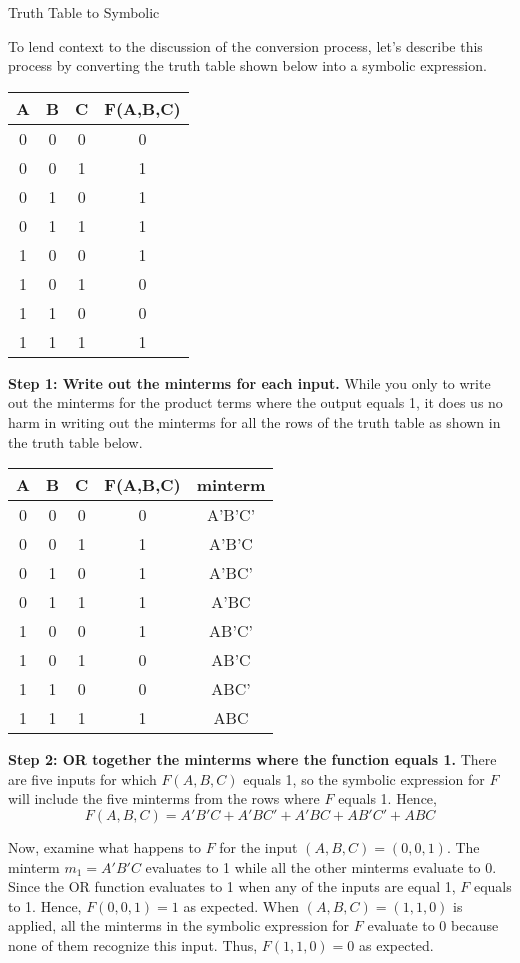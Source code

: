 \begin{process}{Truth Table to Symbolic}
\label{process:representationTTtoSymbolic}

To lend context to the discussion of the conversion process, let's describe this
process by converting the truth table shown below into a symbolic expression.

\begin{tabular}{c|c|c||c}
A & B & C & F(A,B,C)		\\ \hline
0 & 0 & 0 & 0		\\ \hline
0 & 0 & 1 & 1		\\ \hline
0 & 1 & 0 & 1		\\ \hline
0 & 1 & 1 & 1		\\ \hline
1 & 0 & 0 & 1		\\ \hline
1 & 0 & 1 & 0		\\ \hline
1 & 1 & 0 & 0		\\ \hline
1 & 1 & 1 & 1		\\ 
\end{tabular}

\textbf{Step 1: Write out the minterms for each input.}
While you only  to write out the minterms for the product
terms where the output equals 1, it does us no harm in writing out the minterms
for all the rows of the truth table as shown in the truth table below.

\begin{tabular}{c|c|c||c|c}
A & B & C & F(A,B,C)	& minterm	\\ \hline
0 & 0 & 0 & 0		& A'B'C'  	\\ \hline
0 & 0 & 1 & 1		& A'B'C		\\ \hline
0 & 1 & 0 & 1		& A'BC'   	\\ \hline
0 & 1 & 1 & 1		& A'BC   	\\ \hline
1 & 0 & 0 & 1		& AB'C'  	\\ \hline
1 & 0 & 1 & 0		& AB'C  		\\ \hline
1 & 1 & 0 & 0		& ABC'		\\ \hline
1 & 1 & 1 & 1		& ABC  		\\ 
\end{tabular}
\vspace{0.2mm}

\textbf{Step 2: OR together the minterms where the function equals 1.}
There are five inputs for which $F(A,B,C)$ equals 1, so the symbolic
expression for $F$ will include the five minterms from the rows where
$F$ equals 1.  Hence, 
$$F(A,B,C) =  A'B'C + A'BC' + A'BC + AB'C' + ABC$$

Now, examine what happens to $F$ for the input $(A,B,C)=(0,0,1)$.  
The minterm $m_1=A'B'C$ evaluates to 1 while all the other minterms 
evaluate to 0.  Since the OR function evaluates to 1 when any of 
the inputs are equal 1, $F$ equals to 1. Hence, $F(0,0,1)=1$ as
expected.  When $(A,B,C)=(1,1,0)$ is applied, all the
minterms in the symbolic expression for $F$ evaluate to 0 because
none of them recognize this input.  Thus, $F(1,1,0)=0$ as expected.
\end{process}

